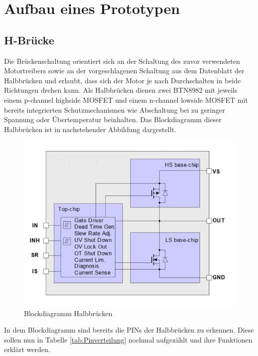 \chapter{Aufbau eines Prototypen}
\section{H-Brücke}
Die Brückenschaltung orientiert sich an der Schaltung des zuvor verwendeten Motortreibers sowie an der vorgeschlagenen Schaltung aus dem Datenblatt der Halbbrücken und erlaubt, dass sich der Motor je nach Durchschalten in beide Richtungen drehen kann.
Als Halbbrücken dienen zwei BTN8982 mit jeweils einem p-channel highside MOSFET und einem n-channel lowside MOSFET mit bereits integrierten Schutzmechanismen wie Abschaltung bei zu geringer Spannung oder Übertemperatur beinhalten.  Das Blockdiagramm dieser Halbbrücken ist in nachstehender Abbildung dargestellt.
\begin{figure}[h]
	\centering
		\includegraphics{Bilder/Blockdiagramm Halbbruecken.jpg}
	\caption{Blockdiagramm Halbbrücken}
	\label{fig:Blockdiagramm Halbbruecken}
\end{figure}
In dem Blockdiagramm sind bereits die PINs der Halbbrücken zu erkennen. Diese sollen nun in Tabelle \ref{tab:Pinverteilung} nochmal aufgezählt und ihre Funktionen erklärt werden.

